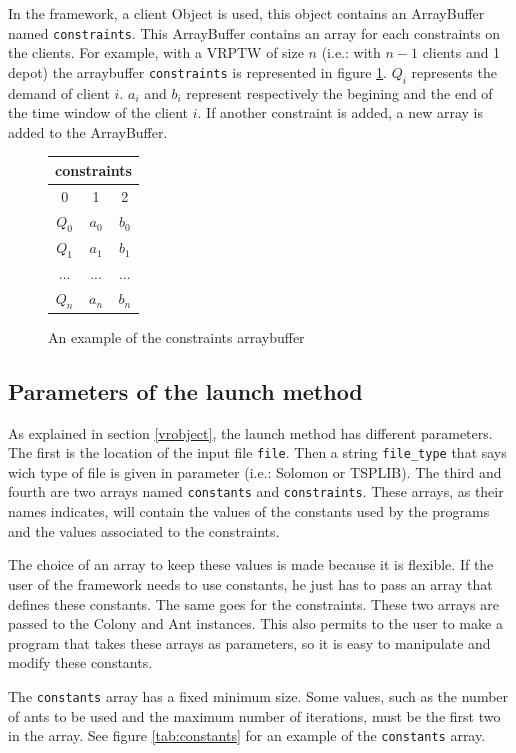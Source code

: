	In the framework, a client Object is used, this object contains an ArrayBuffer named \texttt{constraints}. This ArrayBuffer contains an array for each constraints on the clients. For example, with a VRPTW of size $n$ (i.e.: with $n-1$ clients and 1 depot) the arraybuffer \texttt{constraints} is represented in figure \ref{fig:arraybuffer}. $Q_i$ represents the demand of client $i$. $a_i$ and $b_i$ represent respectively the begining and the end of the time window of the client $i$. If another constraint is added, a new array is added to the ArrayBuffer.
	\begin{figure}%
	\center
	\begin{tabular}{|c|c|c|}
		\hline
		\multicolumn{3}{|c|}{constraints} \\
		\hline
		0 & 1 & 2 \\
		\hline
		$Q_0$ & $a_0$ & $b_0$ \\
		$Q_1$ & $a_1$ & $b_1$ \\
		... & ... & ...\\
		$Q_n$ & $a_n$ & $b_n$ \\
		\hline
	\end{tabular}
	\caption{An example of the constraints arraybuffer}%
	\label{fig:arraybuffer}%
	\end{figure}
	
\subsection{Parameters of the launch method}\label{param}
	As explained in section \ref{vrobject}, the launch method has different parameters. The first is the location of the input file \texttt{file}. Then a string \texttt{file\_type} that says wich type of file is given in parameter (i.e.: Solomon or TSPLIB). The third and fourth are two arrays named \texttt{constants} and \texttt{constraints}. These arrays, as their names indicates, will contain the values of the constants used by the programs and the values associated to the constraints.
	
	The choice of an array to keep these values is made because it is flexible. If the user of the framework needs to use constants, he just has to pass an array that defines these constants. The same goes for the constraints. These two arrays are passed to the Colony and Ant instances. This also permits to the user to make a program that takes these arrays as parameters, so it is easy to manipulate and modify these constants.
	
	The \texttt{constants} array has a fixed minimum size. Some values, such as the number of ants to be used and the maximum number of iterations, must be the first two in the array. See figure \ref{tab:constants} for an example of the \texttt{constants} array.
	
